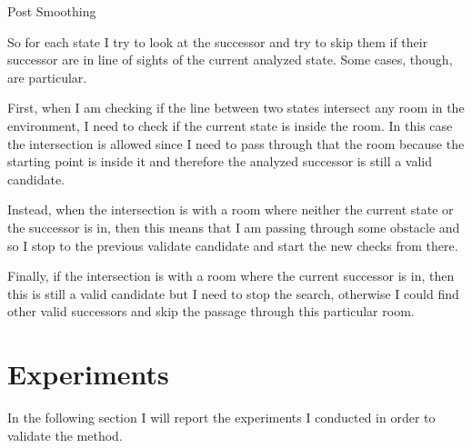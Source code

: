 \documentclass[conference,12pt]{IEEEtran}
\begin{document}
\begin{algorithm}
\caption{Post Smoothing}\label{euclid}
\begin{algorithmic}[1]
\EndIf
{}
\EndIf
\EndFor
{}
\EndIf
\EndFor
\EndFor
\EndProcedure
\end{algorithmic}
\end{algorithm}

So for each state I try to look at the successor and try to skip them if their successor are in line of sights of the current analyzed state. Some cases, though, are particular. 

First, when I am checking if the line between two states intersect any room in the environment, I need to check if the current state is inside the room. In this case the intersection is allowed since I need to pass through that the room because the starting point is inside it and therefore the analyzed successor is still a valid candidate. 

Instead, when the intersection is with a room where neither the current state or the successor is in, then this means that I am passing through some obstacle and so I stop to the previous validate candidate and start the new checks from there. 

Finally, if the intersection is with a room where the current successor is in, then this is still a valid candidate but I need to stop the search, otherwise I could find other valid successors and skip the passage through this particular room.

\section{Experiments}

In the following section I will report the experiments I conducted in order to validate the method.
\end{document}
